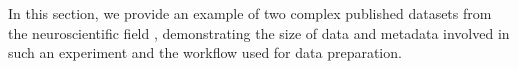 In this section, we provide an example of two complex published datasets from the neuroscientific field \citep{Brochier_2018}, demonstrating the size of data and metadata involved in such an experiment and the workflow used for data preparation.


% 
% 
% 
% 


% 
% 
% 
% 
% 


% 
